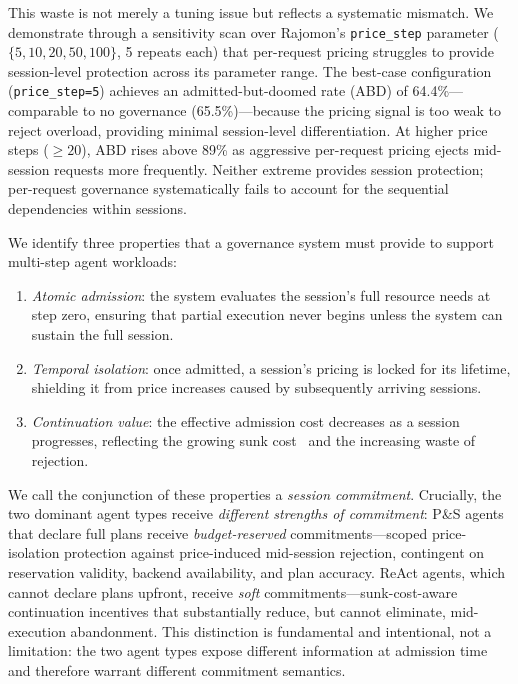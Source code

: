 \documentclass[sigconf,review,anonymous]{acmart}
\begin{document}
This waste is not merely a tuning issue but reflects a systematic mismatch. We demonstrate through a sensitivity scan over Rajomon's \texttt{price\_step} parameter ($\{5, 10, 20, 50, 100\}$, 5 repeats each) that per-request pricing struggles to provide session-level protection across its parameter range. The best-case configuration (\texttt{price\_step=5}) achieves an admitted-but-doomed rate (ABD) of 64.4\%---comparable to no governance (65.5\%)---because the pricing signal is too weak to reject overload, providing minimal session-level differentiation. At higher price steps (${\geq}20$), ABD rises above 89\% as aggressive per-request pricing ejects mid-session requests more frequently. Neither extreme provides session protection; per-request governance systematically fails to account for the sequential dependencies within sessions.


We identify three properties that a governance system must provide to support multi-step agent workloads:
\begin{enumerate}[nosep,leftmargin=*]
  \item \emph{Atomic admission}: the system evaluates the session's full resource needs at step zero, ensuring that partial execution never begins unless the system can sustain the full session.
  \item \emph{Temporal isolation}: once admitted, a session's pricing is locked for its lifetime, shielding it from price increases caused by subsequently arriving sessions.
  \item \emph{Continuation value}: the effective admission cost decreases as a session progresses, reflecting the growing sunk cost~\cite{sunkcost_econ} and the increasing waste of rejection.
\end{enumerate}
We call the conjunction of these properties a \emph{session commitment}. Crucially, the two dominant agent types receive \emph{different strengths of commitment}: P\&S agents that declare full plans receive \emph{budget-reserved} commitments---scoped price-isolation protection against price-induced mid-session rejection, contingent on reservation validity, backend availability, and plan accuracy. ReAct agents, which cannot declare plans upfront, receive \emph{soft} commitments---sunk-cost-aware continuation incentives that substantially reduce, but cannot eliminate, mid-execution abandonment. This distinction is fundamental and intentional, not a limitation: the two agent types expose different information at admission time and therefore warrant different commitment semantics.
\end{document}
